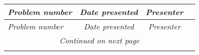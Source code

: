 \documentclass[12pt]{amsart}
\begin{document}
    \begin{longtable}{p{4cm}|c|c|c}
        \emph{Problem number} &\emph{Date presented} & \emph{Presenter} \\ \hline
        \endfirsthead
        \emph{Problem number} & \emph{Date presented} & \emph{Presenter} \\ \hline
        \endhead
        \hline
        \multicolumn{4}{c}{\emph{Continued on next page}} \\
        \endfoot
        \hline 
        \endlastfoot

\end{longtable}
\end{document}
